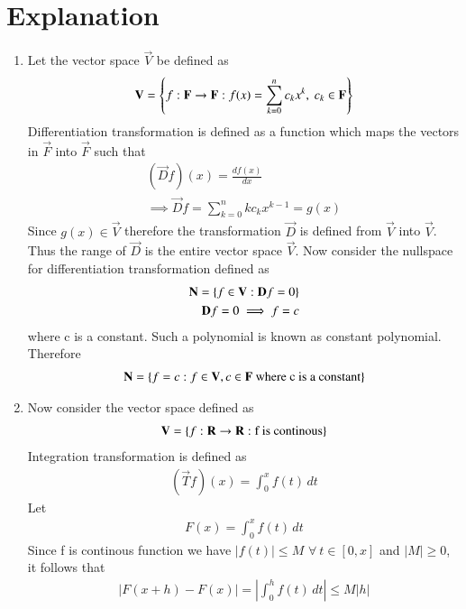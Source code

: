 \documentclass[journal,12pt,twocolumn]{IEEEtran}
\begin{document}
\section{Explanation}
\begin{enumerate}[label=\emph{\alph*)}]
\item
Let the vector space $\vec{V}$ be defined as 
\begin{align}
	\mathbf{V}=\left\{f:\mathbf{F}\rightarrow \mathbf{F} : f(x)=\sum_{k=0}^{n}c_kx^k, \ c_k \in \mathbf{F} \right\}
\end{align}
Differentiation transformation is defined as a function which maps the vectors in $\vec{F}$ into $\vec{F}$ such that
\begin{align}
	(\vec{D}f)(x)=\frac{df(x)}{dx}\\
	\implies 
	\vec{D}f=\sum_{k=0}^{n}kc_kx^{k-1}=g(x)
\end{align}
Since $g(x) \in \vec{V}$ therefore the transformation  $\vec{D}$ is defined from $\vec{V}$ into $\vec{V}$. Thus the range of $\vec{D}$ is the entire vector space $\vec{V}$. Now consider the nullspace 
for differentiation transformation defined as
\begin{align}
	\mathbf{N}=\left\{f \in \mathbf{V} : \mathbf{D}f=0\right\} \\
	\mathbf{D}f=0 \implies f=c
\end{align}
where c is a constant. Such a polynomial is known as constant polynomial. Therefore
\begin{align}
	\mathbf{N}=\left\{f=c : f \in \mathbf{V}, c \in \mathbf{F} \ \text{where c is a constant}\right\}
\end{align}
\item
Now consider the vector space defined as 
\begin{align}
	\mathbf{V}=\left\{f:\mathbf{R} \rightarrow \mathbf{R} : \text{f is continous}\right\}
\end{align}
Integration transformation is defined as 
\begin{align}
	(\vec{T}f)(x)=\int_{0}^{x}f(t)\,dt
\end{align}
Let
\begin{align}
	F(x)=\int_{0}^{x}f(t)\,dt
\end{align}
Since f is continous function we have $\left\vert f(t) \right\vert \leq M$ $\forall \ t \in [0,x] $
and $\left\vert M \right\vert \geq 0$, it follows that
\begin{align}
	\left\vert F(x+h) - F(x) \right\vert = 
	\left\vert \int_{0}^{h} f(t)\,dt \right\vert \leq M\left\vert h \right\vert
\end{align}

\end{enumerate}
\end{document}
